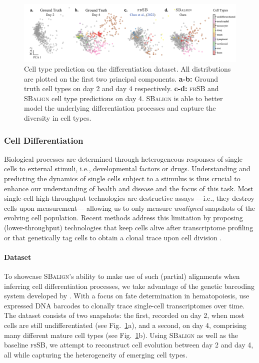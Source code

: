 \begin{figure}[t]
    \centering
    \includegraphics[width=\textwidth]{figures/fig_cell_pred_types.pdf}
    \caption{Cell type prediction on the differentiation dataset. All distributions are plotted on the first two principal components. \textbf{a-b:} Ground truth cell types on day 2 and day 4 respectively. \textbf{c-d:} \textsc{fbSB} and \textsc{SBalign} cell type predictions on day 4. \textsc{SBalign} is able to better model the underlying differentiation processes and capture the diversity in cell types.}
    \label{fig:results_cell_class}
\end{figure}

\subsubsection{Cell Differentiation}
\label{sec:cell}

 Biological processes are determined through heterogeneous responses of single cells to external stimuli, i.e., developmental factors or drugs. Understanding and predicting the dynamics of single cells subject to a stimulus is thus crucial to enhance our understanding of health and disease and the focus of this task.
Most single-cell high-throughput technologies are destructive assays ---i.e., they destroy cells upon measurement--- allowing us to only measure \textit{unaligned} snapshots of the evolving cell population. Recent methods address this limitation by proposing (lower-throughput) technologies that keep cells alive after transcriptome profiling \citep{chen2022live} or that genetically tag cells to obtain a clonal trace upon cell division \citep{weinreb2020lineage}.

\paragraph{Dataset} To showcase \textsc{SBalign}'s ability to make use of such (partial) alignments when inferring cell differentiation processes, we take advantage of the genetic barcoding system developed by \citet{weinreb2020lineage}. With a focus on fate determination in hematopoiesis, \citet{weinreb2020lineage} use expressed DNA barcodes to clonally trace single-cell transcriptomes over time. The dataset consists of two snapshots: the first, recorded on day 2, when most cells are still undifferentiated (see Fig.~\ref{fig:results_cell_class}a), and a second, on day 4, comprising many different mature cell types (see Fig.~\ref{fig:results_cell_class}b). Using \textsc{SBalign} as well as the baseline \textsc{fsSB}, we attempt to reconstruct cell evolution between day 2 and day 4, all while capturing the heterogeneity of emerging cell types.

